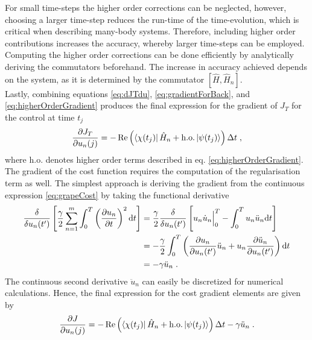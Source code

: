 For small time-steps the higher order corrections can be neglected, however, choosing a larger time-step reduces the run-time of the time-evolution, which is critical when describing many-body systems. Therefore, including higher order contributions increases the accuracy, whereby larger time-steps can be employed. Computing the higher order corrections can be done efficiently by analytically deriving the commutators beforehand. The increase in accuracy achieved depends on the system, as it is determined by the commutator $\left[ \hat{H} , \hat{H}_n  \right]$.\\
Lastly, combining equations \eqref{eq:dJTdu}, \eqref{eq:gradientForBack}, and \eqref{eq:higherOrderGradient} produces the final expression for the gradient of $J_T$ for the control at time $t_j$ 
\begin{equation}
		\frac{\partial J_T}{\partial u_n (j)}  = - \Re \left( \bra{\chi (t_j)} \hat{H}_n + \mathrm{h.o.}  \ket{\psi (t_{j})} \right)  \Delta t \; ,
\end{equation}
where $\mathrm{h.o.}$ denotes higher order terms described in eq. \eqref{eq:higherOrderGradient}.\\

The gradient of the cost function requires the computation of the regularisation term as well. The simplest approach is deriving the gradient from the continuous expression \eqref{eq:grapeCost} by taking the functional derivative
\begin{align}
	\frac{\delta }{\delta u_n (t')} \left[ \frac{\gamma}{2} \sum_{n=1}^{m} \int_{0}^{T} \left( \pdv{u_n}{t} \right)^2 \mathrm{d}t \right]
	&= \frac{\gamma}{2} \frac{\delta }{\delta u_n (t')} \left[ u_n \dot{u}_n \Big|_0^T - \int_0^T u_n \ddot{u}_n \mathrm{d}t \right] \nonumber \\
	&=  - \frac{\gamma}{2} \int_0^T \left( \pdv{u_n}{u_n (t')} \ddot{u}_n + u_n \pdv{\ddot{u}_n}{u_n (t')} \right) \mathrm{d}t  \nonumber \\
	&=  - \gamma \ddot{u}_n \; . \label{eq:regularisationGradient} 
\end{align} 
The continuous second derivative $\ddot{u}_n$ can easily be discretized for numerical calculations. Hence, the final expression for the cost gradient elements are given by
\begin{equation}
	\frac{\partial J}{\partial u_n (j)}  = - \Re \left( \bra{\chi (t_j)} \hat{H}_n + \mathrm{h.o.}  \ket{\psi (t_{j})} \right)  \Delta t - \gamma \ddot{u}_n \; .
	\label{eq:costGradient}
\end{equation}\\

